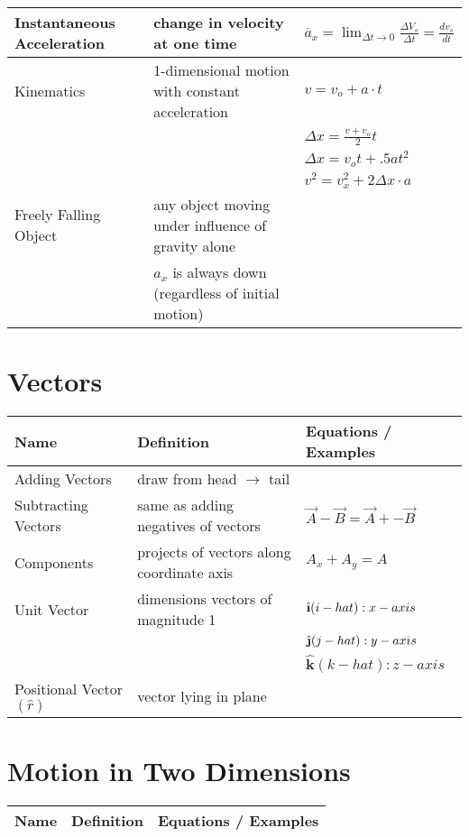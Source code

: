 \documentclass[11pt]{article}
\newcommand{\ihat}{\hat{\textbf{\i}}}
\newcommand{\jhat}{\hat{\textbf{\j}}}
\newcommand{\khat}{\hat{\textbf{k}}}
\begin{document}
\begin{tabularx}{\textwidth}{l| X l}
    Instantaneous Acceleration & change in velocity at one time                                           & $ \overline{a}_{x} = \lim_{\Delta t \to 0} \frac{\Delta V_{s}}{\Delta t} = \frac{dv_{s}}{dt} $ \bigstrut \\ \hline
    Kinematics                 & 1-dimensional motion with constant acceleration                          & $ v= v_{o} + a \cdot t $ \\*                                                                                       &  & $ \Delta x = \frac{v + v_{o}}{2}t $ \\* &  & $ \Delta x = v_{o}t + .5at^{2} $ \\* &  & $ v^{2} = v^{2}_{x}+ 2\Delta x \cdot a$ \bigstrut \\ \hline
    Freely Falling Object      & any object moving under influence of gravity alone \\*                   & $ a_{x} $ is always down (regardless of initial motion) \\ \hline
\end{tabularx}

\section{Vectors}
\begin{tabularx}{\textwidth}{l| X l}
    Name                            & Definition                                & Equations / Examples \\ \hline
    Adding Vectors                  & draw from head $ \to $ tail \\ \hline
    Subtracting Vectors             & same as adding negatives of vectors       & $ \vec{A} - \vec{B} = \vec{A} + - \vec{B} $ \bigstrut \\ \hline
    Components                      & projects of vectors along coordinate axis & $ A_{x} + A_{y} = A $ \bigstrut \\ \hline
    Unit Vector                     & dimensions vectors of magnitude 1         & $ \ihat (i-hat) : x-axis $ \\* &  & $ \jhat (j-hat): y-axis $ \\* &  & $ \khat (k-hat): z-axis $ \bigstrut \\ \hline
    Positional Vector $ (\hat{r}) $ & vector lying in plane                     &
\end{tabularx}

\section{Motion in Two Dimensions}
\begin{tabularx}{\textwidth}{l| X l}
    Name & Definition & Equations / Examples \\ \hline
\end{tabularx}
\end{document}

